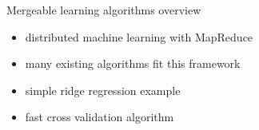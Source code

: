 \begin{frame}{Mergeable learning algorithms overview}

\begin{itemize}
\Large
\item distributed machine learning with MapReduce
\item many existing algorithms fit this framework
\item simple ridge regression example
\item fast cross validation algorithm
\end{itemize}

\end{frame}



